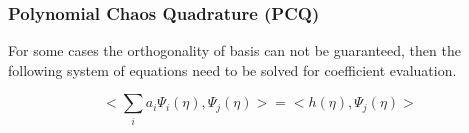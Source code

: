 \documentclass[10pt]{beamer}
\begin{document}
\begin{frame}
\frametitle{Polynomial Chaos Quadrature (PCQ)}
For some cases the orthogonality of basis can not be guaranteed, then the following system of equations need to be solved for coefficient evaluation.

\begin{equation}
    <\sum_i a_i \Psi_i (\eta), \Psi_j (\eta)>   = <h(\eta), \Psi_j (\eta) >
\end{equation}
\end{frame}
\end{document}
